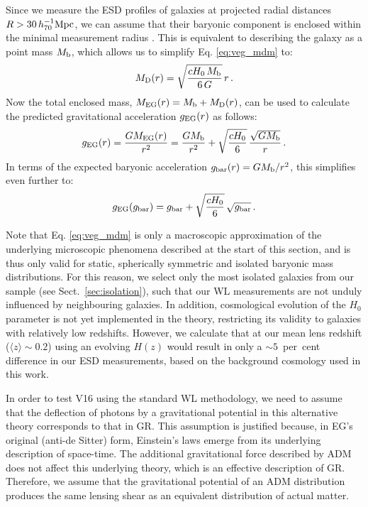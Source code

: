 \documentclass[usenatbib]{mnras}
\newcommand{\hsMpc}{\, h_{70}^{-1}{\rm{Mpc}} }
\newcommand{\un}[1]{_{\rm #1}}
\begin{document}
Since we measure the ESD profiles of galaxies at projected radial distances $R>30 \hsMpc$, we can assume that their baryonic component is enclosed within the minimal measurement radius \cite[see also][]{brouwer2017}. This is equivalent to describing the galaxy as a point mass $M\un{b}$, which allows us to simplify Eq. \ref{eq:veg_mdm} to:
\begin{equation}
M\un{D}(r)=\sqrt{\frac{cH_{0} \, M\un{b}}{6 \, G}} \, r \, .
\end{equation}
Now the total enclosed mass, $M\un{EG}(r) = M\un{b} + M\un{D}(r)$, can be used to calculate the predicted gravitational acceleration $g\un{EG}(r)$ as follows:
\begin{equation}
	g\un{EG}(r) = \frac{G M\un{EG}(r)}{r^2} = \frac{G M\un{b}}{r^2} + \sqrt{\frac{cH_{0}}{6}} \, \frac{\sqrt{G M\un{b}}}{r} \, .
\end{equation}
In terms of the expected baryonic acceleration $g\un{bar}(r) = G M\un{b}/r^2$, this simplifies even further to:
\begin{equation}
\label{eq:rar_verlinde}
g\un{EG}(g\un{bar}) = g\un{bar} + \sqrt{\frac{cH_{0}}{6}} \, \sqrt{g\un{bar}} \, .
\end{equation}

Note that Eq. \ref{eq:veg_mdm} is only a macroscopic approximation of the underlying microscopic phenomena described at the start of this section, and is thus only valid for static, spherically symmetric and isolated baryonic mass distributions. For this reason, we select only the most isolated galaxies from our sample (see Sect.~\ref{sec:isolation}), such that our WL measurements are not unduly influenced by neighbouring galaxies. In addition, cosmological evolution of the $H_0$ parameter is not yet implemented in the theory, restricting its validity to galaxies with relatively low redshifts. However, we calculate that at our mean lens redshift ($\langle z \rangle \sim 0.2$) using an evolving $H(z)$ would result in only a $\sim5$~per~cent difference in our ESD measurements, based on the background cosmology used in this work.

In order to test V16 using the standard WL methodology, we need to assume that the deflection of photons by a gravitational potential in this alternative theory corresponds to that in GR. This assumption is justified because, in EG's original (anti-de Sitter) form, Einstein's laws emerge from its underlying description of space-time. The additional gravitational force described by ADM does not affect this underlying theory, which is an effective description of GR. Therefore, we assume that the gravitational potential of an ADM distribution produces the same lensing shear as an equivalent distribution of actual matter.
\end{document}

